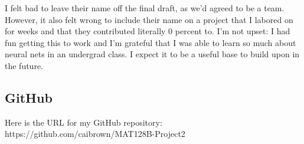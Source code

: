 \documentclass[letterpaper,11pt]{article}
\begin{document}
I felt bad to leave their name off the final draft, as we'd agreed to be a team. However, it also felt wrong to include their name on a project that I labored on for weeks and that they contributed literally 0 percent to. I'm not upset: I had fun getting this to work and I'm grateful that I was able to learn so much about neural nets in an undergrad class. I expect it to be a useful base to build upon in the future.

\subsection{GitHub}

Here is the URL for my GitHub repository:\\

https://github.com/caibrown/MAT128B-Project2
\end{document}
